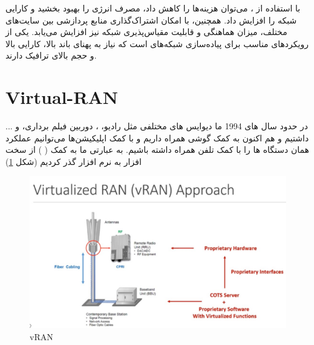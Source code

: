 \documentclass[landscape, 12pt]{report}
\begin{document}
  با استفاده از 
  ، می‌توان هزینه‌ها را کاهش داد، مصرف انرژی را بهبود بخشید و کارایی شبکه را افزایش داد. همچنین، با امکان اشتراک‌گذاری منابع پردازشی بین سایت‌های مختلف، میزان هماهنگی و قابلیت مقیاس‌پذیری شبکه نیز افزایش می‌یابد. 
   یکی از رویکردهای مناسب برای پیاده‌سازی شبکه‌های 
    است که نیاز به پهنای باند بالا، کارایی بالا و حجم بالای ترافیک دارند.
\section*{Virtual-RAN}                    
در حدود سال های 1994 ما دیوایس های مختلفی مثل رادیو،
 ، دوربین فیلم برداری،
   و ... داشتیم و هم اکنون به کمک
    گوشی همراه داریم و با کمک اپلیکیشن‌ها می‌توانیم عملکرد همان دستگاه ها را با کمک تلفن همراه داشته باشیم. به عبارتی ما به کمک
      ( 
    ) از سخت افزار به نرم افزار گذر کردیم (شکل \ref{fig:vRAN})
    \begin{figure}[ht]
    	\centering
    	\includegraphics[width=.6\linewidth]{Pic/vRAN}
    	\caption{vRAN}
    	\label{fig:vRAN}
    \end{figure}
    
    
\end{document}
